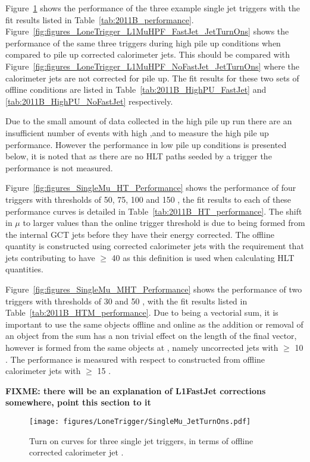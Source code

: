Figure~\ref{fig:figures_LoneTrigger_SingleMu_JetTurnOns} shows the performance 
of the three example \Lone single jet triggers with the fit results listed in 
Table~\ref{tab:2011B_performance}.
Figure~\ref{fig:figures_LoneTrigger_L1MuHPF_FastJet_JetTurnOns} shows the 
performance of the same three triggers during high pile up conditions when 
compared to pile up corrected \AK calorimeter jets. This should be compared with
Figure~\ref{fig:figures_LoneTrigger_L1MuHPF_NoFastJet_JetTurnOns} where the \AK
calorimeter jets are not corrected for pile up. The fit results for these two
sets of offline conditions are listed in Table~\ref{tab:2011B_HighPU_FastJet} 
and \ref{tab:2011B_HighPU_NoFastJet} respectively.


Due to the small amount of data collected in the high pile up run there are 
an insufficient number of events with high \MET,\HTm and \HT to measure the 
high pile up performance. However the performance in low pile up conditions is 
presented below, it is noted that as there are no HLT paths seeded by a \Lone 
\ET trigger the performance is not measured.

Figure~\ref{fig:figures_SingleMu_HT_Performance} shows the performance of four
\Lone \HT triggers with thresholds of 50, 75, 100 and 150 \GeV, the fit results 
to each of these performance curves is detailed in 
Table~\ref{tab:2011B_HT_performance}. The shift in $\mu$ to larger values than 
the online \Lone trigger threshold is due to \Lone \HT being formed from the 
internal GCT jets before they have their energy corrected. The offline quantity 
is constructed using corrected \AK calorimeter jets with the requirement that 
jets contributing to \HT have \ET $\geq$ 40 \GeV as this definition is used when calculating HLT quantities.

Figure~\ref{fig:figures_SingleMu_MHT_Performance} shows the performance of two 
\Lone \HTm triggers with thresholds of 30 and 50 \GeV, with the fit results 
listed in Table~\ref{tab:2011B_HTM_performance}. Due to \HTm being a vectorial 
sum, it is important to use the same objects offline and online as the addition 
or removal of an object from the sum has a non trivial effect on the length of 
the final vector, however \Lone \HTm is formed from the same objects at \Lone 
\HT, namely uncorrected \Lone jets with \ET $\geq$ 10 \GeV. The performance is 
measured with respect to \HTm constructed from offline \AK calorimeter jets 
with \ET $\geq$ 15 \GeV.



\textbf{FIXME: there will be an explanation of L1FastJet corrections somewhere, 
point this section to it}
\begin{figure}[ht]
  \centering
    \texttt{[image: figures/LoneTrigger/SingleMu\_JetTurnOns.pdf]}
  \caption{Turn on curves for three \Lone single jet triggers, in terms of 
  offline corrected \AK calorimeter jet \ET.}
  \label{fig:figures_LoneTrigger_SingleMu_JetTurnOns}
\end{figure}


